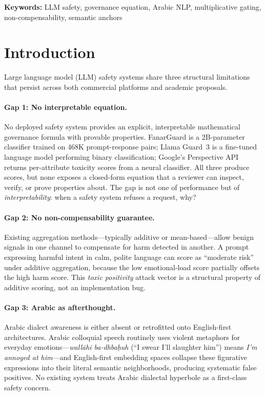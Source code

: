 \documentclass[11pt,a4paper]{article}
\begin{document}
\begin{abstract}
\end{abstract}

\noindent\textbf{Keywords:} LLM safety, governance equation, Arabic NLP, multiplicative gating, non-compensability, semantic anchors

\section{Introduction}
\label{sec:intro}

Large language model (LLM) safety systems share three structural limitations that persist across both commercial platforms and academic proposals.

\paragraph{Gap 1: No interpretable equation.}
No deployed safety system provides an explicit, interpretable mathematical governance formula with provable properties. FanarGuard \citep{fanarguard2025} is a 2B-parameter classifier trained on 468K prompt-response pairs; Llama Guard~3 \citep{llamaguard2024} is a fine-tuned language model performing binary classification; Google's Perspective API \citep{perspective2017} returns per-attribute toxicity scores from a neural classifier. All three produce scores, but none exposes a closed-form equation that a reviewer can inspect, verify, or prove properties about. The gap is not one of performance but of \emph{interpretability}: when a safety system refuses a request, why?

\paragraph{Gap 2: No non-compensability guarantee.}
Existing aggregation methods---typically additive or mean-based---allow benign signals in one channel to compensate for harm detected in another. A prompt expressing harmful intent in calm, polite language can score as ``moderate risk'' under additive aggregation, because the low emotional-load score partially offsets the high harm score. This \emph{toxic positivity} attack vector is a structural property of additive scoring, not an implementation bug.

\paragraph{Gap 3: Arabic as afterthought.}
Arabic dialect awareness is either absent or retrofitted onto English-first architectures. Arabic colloquial speech routinely uses violent metaphors for everyday emotions---\emph{wall\=ahi ba-dhba\d{h}uh} (``I swear I'll slaughter him'') means \emph{I'm annoyed at him}---and English-first embedding spaces collapse these figurative expressions into their literal semantic neighborhoods, producing systematic false positives. No existing system treats Arabic dialectal hyperbole as a first-class safety concern.
\end{document}
